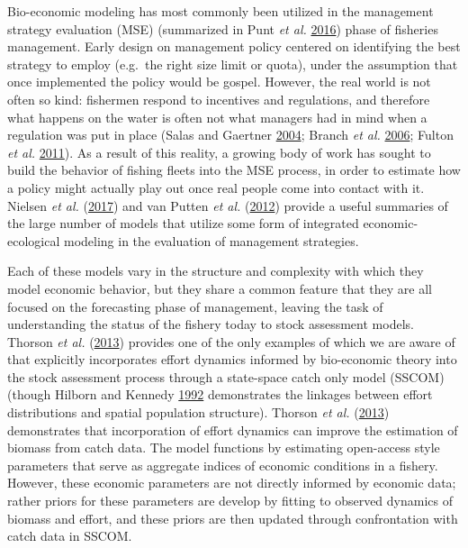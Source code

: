 \documentclass[twoside,12pt,final]{ucthesis-CA2012}
\begin{document}
\begin{ucmainmatter}
Bio-economic modeling has most commonly been utilized in the management
strategy evaluation (MSE) (summarized in Punt \emph{et al.}
\protect\hyperlink{ref-Punt2016a}{2016}) phase of fisheries management.
Early design on management policy centered on identifying the best
strategy to employ (e.g.~the right size limit or quota), under the
assumption that once implemented the policy would be gospel. However,
the real world is not often so kind: fishermen respond to incentives and
regulations, and therefore what happens on the water is often not what
managers had in mind when a regulation was put in place (Salas and
Gaertner \protect\hyperlink{ref-Salas2004}{2004}; Branch \emph{et al.}
\protect\hyperlink{ref-Branch2006}{2006}; Fulton \emph{et al.}
\protect\hyperlink{ref-Fulton2011}{2011}). As a result of this reality,
a growing body of work has sought to build the behavior of fishing
fleets into the MSE process, in order to estimate how a policy might
actually play out once real people come into contact with it. Nielsen
\emph{et al.} (\protect\hyperlink{ref-Nielsen2017}{2017}) and van Putten
\emph{et al.} (\protect\hyperlink{ref-vanPutten2012}{2012}) provide a
useful summaries of the large number of models that utilize some form of
integrated economic-ecological modeling in the evaluation of management
strategies.

Each of these models vary in the structure and complexity with which
they model economic behavior, but they share a common feature that they
are all focused on the forecasting phase of management, leaving the task
of understanding the status of the fishery today to stock assessment
models. Thorson \emph{et al.}
(\protect\hyperlink{ref-Thorson2013a}{2013}) provides one of the only
examples of which we are aware of that explicitly incorporates effort
dynamics informed by bio-economic theory into the stock assessment
process through a state-space catch only model (SSCOM) (though Hilborn
and Kennedy \protect\hyperlink{ref-Hilborn1992a}{1992} demonstrates the
linkages between effort distributions and spatial population structure).
Thorson \emph{et al.} (\protect\hyperlink{ref-Thorson2013a}{2013})
demonstrates that incorporation of effort dynamics can improve the
estimation of biomass from catch data. The model functions by estimating
open-access style parameters that serve as aggregate indices of economic
conditions in a fishery. However, these economic parameters are not
directly informed by economic data; rather priors for these parameters
are develop by fitting to observed dynamics of biomass and effort, and
these priors are then updated through confrontation with catch data in
SSCOM.


\end{ucmainmatter}
\end{document}
